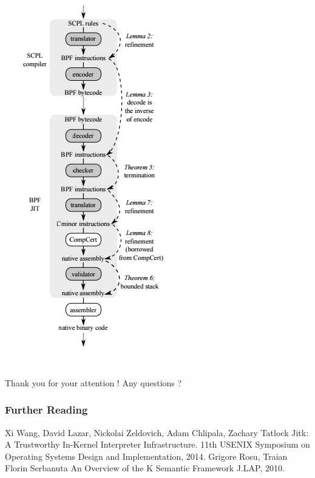 \documentclass{beamer}
\begin{document}
\begin{frame}
\includegraphics[scale=0.3]{Graph1.png}
\end{frame}




\section{}
\begin{frame}
Thank you for your attention ! Any questions ?
\end{frame}
\begin{frame}[allowframebreaks]
  \frametitle<presentation>{Further Reading}    
  \begin{thebibliography}{10}    
  \beamertemplatearticlebibitems
  \bibitem{}
    Xi Wang, David Lazar, Nickolai Zeldovich, Adam Chlipala, Zachary Tatlock
    \newblock Jitk: A Trustworthy In-Kernel Interpreter Infrastructure.
    \newblock 11th USENIX Symposium on Operating Systems Design and Implementation, 2014.
  \beamertemplatearticlebibitems
  \bibitem{}
    Grigore Rosu, Traian Florin Serbanuta
    \newblock An Overview of the K Semantic Framework
    \newblock J.LAP, 2010.
  \end{thebibliography}
\end{frame}
\end{document}
